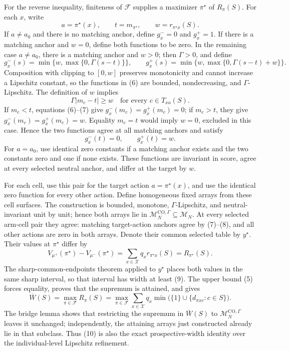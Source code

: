For the reverse inequality, finiteness of \(\mathcal F\) supplies a maximizer \(\pi^\star\) of \(R_\pi(S)\).  For each \(x\), write
\[
a=\pi^\star(x),
\qquad t=m_{\pi^\star},
\qquad w=r_{\pi^\star x}(S).
\]
If \(a\neq a_0\) and there is no matching anchor, define \(g_x^-=0\) and \(g_x^+=1\).  If there is a matching anchor and \(w=0\), define both functions to be zero.  In the remaining case \(a\neq a_0\), there is a matching anchor and \(w>0\); then \(\Gamma>0\), and define
\[
g_x^-(s)=\min\{w,\max\{0,\Gamma(s-t)\}\},
\qquad
g_x^+(s)=\min\{w,\max\{0,\Gamma(s-t)+w\}\}.
\tag{6}
\]
Composition with clipping to \([0,w]\) preserves monotonicity and cannot increase a Lipschitz constant, so the functions in (6) are bounded, nondecreasing, and \(\Gamma\)-Lipschitz.  The definition of \(w\) implies
\[
\Gamma|m_c-t|\geq w
\quad\text{for every }c\in T_{xa}(S).
\tag{7}
\]
If \(m_c<t\), equations (6)--(7) give \(g_x^-(m_c)=g_x^+(m_c)=0\); if \(m_c>t\), they give \(g_x^-(m_c)=g_x^+(m_c)=w\).  Equality \(m_c=t\) would imply \(w=0\), excluded in this case.  Hence the two functions agree at all matching anchors and satisfy
\[
g_x^-(t)=0,
\qquad g_x^+(t)=w.
\tag{8}
\]
For \(a=a_0\), use identical zero constants if a matching anchor exists and the two constants zero and one if none exists.  These functions are invariant in score, agree at every selected neutral anchor, and differ at the target by \(w\).

For each cell, use this pair for the target action \(a=\pi^\star(x)\), and use the identical zero function for every other action.  Define homogeneous fixed arrays from these cell surfaces.  The construction is bounded, monotone, \(\Gamma\)-Lipschitz, and neutral-invariant unit by unit; hence both arrays lie in \(\mathcal M_N^{\mathrm{CO},\Gamma}\subseteq\mathcal M_N\).  At every selected arm-cell pair they agree: matching target-action anchors agree by (7)--(8), and all other actions are zero in both arrays.  Denote their common selected table by \(y^\star\).  Their values at \(\pi^\star\) differ by
\[
V_{\mu^+}(\pi^\star)-V_{\mu^-}(\pi^\star)
=\sum_{x\in\mathcal X}q_xr_{\pi^\star x}(S)
=R_{\pi^\star}(S).
\tag{9}
\]
The sharp-common-endpoints theorem applied to \(y^\star\) places both values in the same sharp interval, so that interval has width at least (9).  The upper bound (5) forces equality, proves that the supremum is attained, and gives
\[
\overline W(S)
=\max_{\pi\in\mathcal F}R_\pi(S)
=\max_{\pi\in\mathcal F}\sum_{x\in\mathcal X}q_x
\min\bigl(\{1\}\cup\{d_{\pi xc}:c\in S\}\bigr).
\tag{10}
\]
The bridge lemma shows that restricting the supremum in \(\overline W(S)\) to \(\mathcal M_N^{\mathrm{CO},\Gamma}\) leaves it unchanged; independently, the attaining arrays just constructed already lie in that subclass.  Thus (10) is also the exact prospective-width identity over the individual-level Lipschitz refinement.

